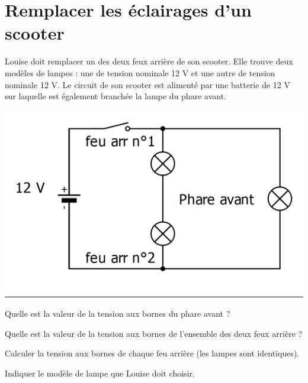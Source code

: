 \section{Remplacer les éclairages d'un scooter}

Louise doit remplacer un des deux feux arrière de son scooter. Elle trouve deux modèles de lampes : une de tension nominale 12 V et une autre de tension nominale 12 V. Le circuit de son scooter est alimenté par une batterie de 12 V sur laquelle est également branchée la lampe du phare avant.


	\begin{center}
		\includegraphics[scale=0.45]{scoot}
	\end{center}


\begin{questions}
	\question Quelle est la valeur de la tension aux bornes du phare avant ?
	
	\question Quelle est la valeur de la tension aux bornes de l'ensemble des deux feux arrière ?
		
	\question Calculer la tension aux bornes de chaque feu arrière (les lampes sont identiques).
	
	
	\question Indiquer le modèle de lampe que Louise doit choisir.
	
\end{questions}

